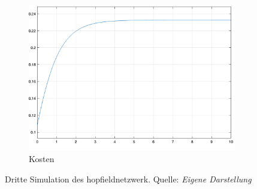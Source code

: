 \begin{figure}[h]
\begin{subfigure}[b]{0.32\textwidth}
    \includegraphics[width=\textwidth]{abbildungen/hnn_simulation_3_kostenfunktion.png}
    \caption{Kosten}
  \end{subfigure}
  \caption{Dritte Simulation des \gls{hopfieldnetzwerk}. Quelle: \textit{Eigene Darstellung}}
  \label{fig:Simulation HNN 3}
\end{figure}
